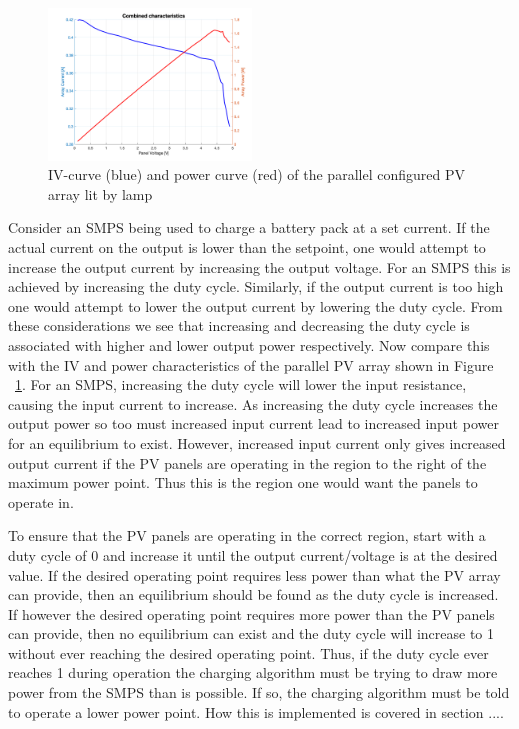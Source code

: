 \documentclass[a4paper]{article}
\begin{document}
\begin{figure}
    \begin{center}
        \includegraphics[width=0.48\textwidth]{Combined.png}
    \vspace{-15pt}
    \end{center}
    \caption{IV-curve (blue) and power curve (red) of the parallel configured PV array lit by lamp}
    \label{fig:parallelArray}
\end{figure}

Consider an SMPS being used to charge a battery pack at a set current. 
If the actual current on the output is lower than the setpoint, one would attempt
to increase the output current by increasing the output voltage. For an SMPS this
is achieved by increasing the duty cycle. Similarly, if the output current is too
high one would attempt to lower the output current by lowering the duty cycle. From 
these considerations we see that increasing and decreasing the duty cycle is 
associated with higher and lower output power respectively. Now compare this with
the IV and power characteristics of the parallel PV array shown in 
Figure ~\ref{fig:parallelArray}. For an SMPS, increasing the duty cycle 
will lower the input resistance, causing the input current to increase. As increasing
the duty cycle increases the output power so too must increased input current lead to
increased input power for an equilibrium to exist. However, increased input current
only gives increased output current if the PV panels are operating in the region to the right of the
maximum power point. Thus this is the region one would want the panels to operate in.

To ensure that the PV panels are operating in the correct region, start with a duty
cycle of 0 and increase it until the output current/voltage is at the desired value.
If the desired operating point requires less power than what the PV array can provide,
then an equilibrium should be found as the duty cycle is increased. If however the 
desired operating point requires more power than the PV panels can provide, then no 
equilibrium can exist and the duty cycle will increase to 1 without ever reaching the
desired operating point. Thus, if the duty cycle ever reaches 1 during operation
the charging algorithm must be trying to draw more power from the SMPS than is 
possible. If so, the charging algorithm must be told to operate a lower power point. How this
is implemented is covered in section ....
\end{document}
